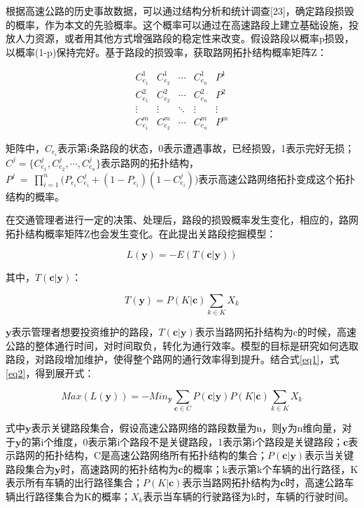 			根据高速公路的历史事故数据，可以通过结构分析和统计调查[23]，确定路段损毁的概率，作为本文的先验概率。这个概率可以通过在高速路段上建立基础设施，投放人力资源，或者用其他方式增强路段的稳定性来改变。假设路段以概率p损毁，以概率(1-p)保持完好。基于路段的损毁率，获取路网拓扑结构概率矩阵Z：

		\[\begin{array}{*{20}{c}}
		{C_{{e_1}}^1}&{C_{{e_2}}^1}& \cdots &{C_{{e_n}}^1}&{{P^1}}\\
		{C_{{e_1}}^2}&{C_{{e_2}}^2}& \cdots &{C_{{e_n}}^2}&{{P^2}}\\
		 \vdots & \vdots & \ddots & \vdots & \vdots \\
		{C_{{e_1}}^m}&{C_{{e_2}}^m}& \cdots &{C_{{e_n}}^m}&{{P^m}}
		\end{array}\]


		矩阵中，$C_{{e_i}}$表示第i条路段的状态，0表示遭遇事故，已经损毁，1表示完好无损；$C^j = \{{C_{{e_1}}^j},{C_{{e_2}}^j},\cdots,{C_{{e_n}}^j}\}$表示路网的拓扑结构，$P^j \ = \ \prod\limits_{i = 1}^n {({P_{{e_i}}}C_{{e_i}}^j + (1 - {P_{{e_i}}})} (1 - C_{{e_i}}^j))$表示高速公路网络拓扑变成这个拓扑结构的概率。

		在交通管理者进行一定的决策、处理后，路段的损毁概率发生变化，相应的，路网拓扑结构概率矩阵Z也会发生变化。在此提出关路段挖掘模型：

		\begin{equation}
		L(\bm{y}) = -E(T(\bm{c}|\bm{y} ))
		\label{eq1}
		\end{equation}

		其中，$T(\bm{c}|\bm{y} )$：

		\begin{equation}
		T(\bm{y} ) = P(K|\bm{c})\sum\limits_{k \in K} {{X_k}} 
		\label{eq2}
		\end{equation}

		$\bm{y} $表示管理者想要投资维护的路段，$T(\bm{c}|\bm{y} )$表示当路网拓扑结构为c的时候，高速公路的整体通行时间，对时间取负，转化为通行效率。模型的目标是研究如何选取路段，对路段增加维护，使得整个路网的通行效率得到提升。结合式\ref{eq1}，式\ref{eq2}，得到展开式：

		\begin{equation}
		Max(L(\bm{y})) = -Mi{n_{\bm{y} }}\sum\limits_{\bm{c} \in C} {P(\bm{c}|\bm{y} )} P(K|\bm{c})\sum\limits_{k \in K} {{X_k}} 
		\label{eq3}
		\end{equation}

		式中$\bm{y} $表示关键路段集合，假设高速公路网络的路段数量为n，则$\bm{y} $为n维向量，对于$\bm{y} $的第i个维度，0表示第i个路段不是关键路段，1表示第i个路段是关键路段；$\bm{c}$表示路网的拓扑结构，C是高速公路网络所有拓扑结构的集合；${P(\bm{c}|\bm{y} )}$表示当关键路段集合为$\bm{y} $时，高速路网的拓扑结构为$\bm{c}$的概率；k表示第k个车辆的出行路径，K表示所有车辆的出行路径集合；$P(K|\bm{c})$表示当路网拓扑结构为$\bm{c}$时，高速公路车辆出行路径集合为K的概率；${{X_k}}$表示当车辆的行驶路径为k时，车辆的行驶时间。

